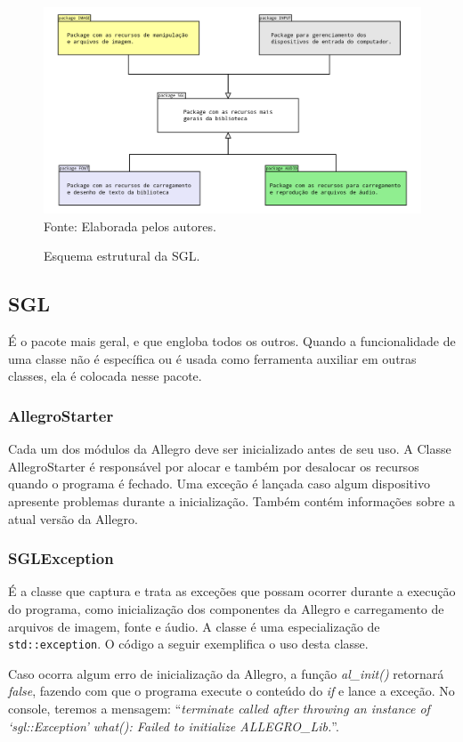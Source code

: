 \begin{figure}[H]
    \centering
     \caption{Esquema estrutural da SGL. }
    \label{pacotes}
    \includegraphics[scale = 0.2]{Imagens/pacotes.png}
    \\Fonte: Elaborada pelos autores.
\end{figure}
%
%
%
\subsection{SGL}
%
%
É o pacote mais geral, e que engloba todos os outros. Quando a funcionalidade de uma classe não é específica ou é usada como ferramenta auxiliar em outras classes, ela é colocada nesse pacote.
%
\subsubsection{AllegroStarter}
%
Cada um dos módulos da Allegro deve ser inicializado antes de seu uso. A Classe AllegroStarter é responsável por alocar e também por desalocar os recursos quando o programa é fechado. Uma exceção é lançada caso algum dispositivo apresente problemas durante a inicialização. Também contém informações sobre a atual versão da Allegro. 
%
%
\subsubsection{SGLException}
%
É a classe que captura e trata as exceções que possam ocorrer durante a execução do programa, como inicialização dos componentes da Allegro e carregamento de arquivos de imagem, fonte e áudio. A classe é uma especialização de \texttt{std::exception}. O código a seguir exemplifica o uso desta classe.
%

%
\par 
Caso ocorra algum erro de inicialização da Allegro, a função \textit{al\_init()} retornará \textit{false}, fazendo com que o programa execute o conteúdo do \textit{if} e lance a exceção. No console, teremos a mensagem:  ``\textit{terminate called after throwing an instance of `sgl::Exception'
what(): Failed to initialize ALLEGRO\_Lib.}''.
%
%
